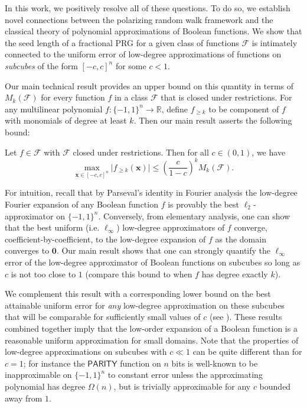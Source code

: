 {In this work, we positively resolve all of these questions. To do so, we establish novel connections between the polarizing random walk framework and the classical theory of polynomial approximations of Boolean functions. We show that the seed length of a fractional PRG for a given class of functions $\mathcal{F}$ is intimately connected to the uniform error of low-degree approximations of functions on \emph{subcubes} of the form $[-c,c]^n$ for some $c<1$.} 

{Our main technical result provides an upper bound on this quantity in terms of $M_k(\mathcal{F})$ for every function $f$ in a class $\mathcal{F}$ that is closed under restrictions. For any multilinear polynomial $f:\{-1,1\}^n\to \mathbb{R}$, define $f_{\geq k}$ to be component of $f$ with monomials of degree at least $k$. Then our main result asserts the following bound:}

\begin{THM}
\label{thm:upperbound}
        Let $f\in \mathcal{F}$ with $\mathcal{F}$ closed under restrictions.  Then for all $c \in (0,1)$, we have
    \begin{equation*}
        \max_{\mathbf{x} \in [-c , c]^n } \vert f_{\geq k} (\mathbf{x})\vert \leq \left( \frac{c}{1 - c} \right)^k M_k(\mathcal{F}).
    \end{equation*}
\end{THM}

{For intuition, recall that by Parseval's identity in Fourier analysis the low-degree Fourier expansion of any Boolean function $f$ is provably the best $\ell_2$-approximator on $\{-1,1\}^n$. Conversely, from elementary analysis, one can show that the best uniform (i.e. $\ell_{\infty}$) low-degree approximators of $f$ converge, coefficient-by-coefficient, to the low-degree expansion of $f$ as the domain converges to $\mathbf{0}$. Our main result shows that one can strongly quantify the $\ell_{\infty}$ error of the low-degree approximator of Boolean functions on subcubes so long as $c$ is not too close to $1$ (compare this bound to when $f$ has degree exactly $k$).}

{We complement this result with a corresponding lower bound on the best attainable uniform error for \emph{any} low-degree approximation on these subcubes that will be comparable for sufficiently small values of $c$ (see ).  These results combined together imply that the low-order expansion of a Boolean function is a reasonable uniform approximation for small domains.  Note that the properties of low-degree approximations on subcubes with $c\ll 1$ can be quite different than for $c=1$; for instance the $\mathsf{PARITY}$ function on $n$ bits is well-known to be inapproximable on $\{-1,1\}^n$ to constant error unless the approximating polynomial has degree $\Omega(n)$, but is trivially approximable for any $c$ bounded away from $1$.}



